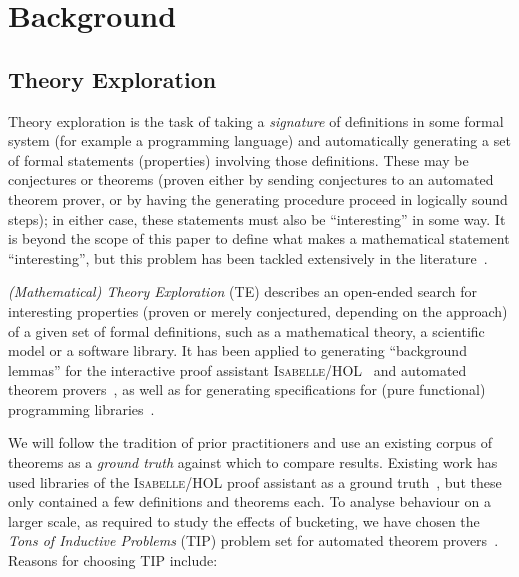 \section{Background}
\label{sec:background}

\subsection{Theory Exploration}
\label{sec:theoryexploration}

Theory exploration is the task of taking a \emph{signature} of definitions in
some formal system (for example a programming language) and automatically
generating a set of formal statements (properties) involving those
definitions. These may be conjectures or theorems (proven either by sending
conjectures to an automated theorem prover, or by having the generating
procedure proceed in logically sound steps); in either case, these statements
must also be ``interesting'' in some way. It is beyond the scope of this paper
to define what makes a mathematical statement ``interesting'', but this problem
has been tackled extensively in the literature~\cite{colton2000notion}.

\emph{(Mathematical) Theory Exploration} (TE) describes an open-ended search for
interesting properties (proven or merely conjectured, depending on the approach)
of a given set of formal definitions, such as a mathematical theory, a
scientific model or a software library. It has been applied to generating
``background lemmas'' for the interactive proof assistant
\textsc{Isabelle/HOL}~\cite{johansson2009isacosy,Hipster} and automated
theorem provers~\cite{claessen2013automating}, as well as for generating
specifications for (pure functional) programming
libraries~\cite{QuickSpec,smallbone2017quick,braquehais2017speculate}.

We will follow the tradition of prior practitioners and use an existing
corpus of theorems as a \emph{ground truth} against which to compare results.
Existing work has used libraries of the \textsc{Isabelle/HOL} proof assistant as
a ground
truth~\cite{Montano-Rivas.McCasland.Dixon.ea:2012,johansson2009isacosy,claessen2013automating},
but these only contained a few definitions and theorems each. To analyse
behaviour on a larger scale, as required to study the effects of bucketing, we
have chosen the \emph{Tons of Inductive Problems} (TIP) problem set for
automated theorem provers~\cite{claessen2015tip}.  Reasons for choosing TIP
include:

